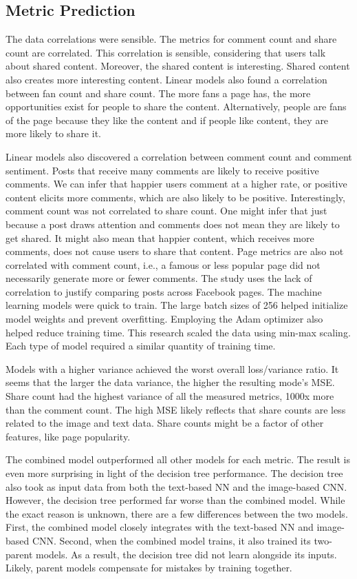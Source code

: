 \documentclass{article}
\begin{document}
\subsection{Metric Prediction}
The data correlations were sensible. The metrics for comment count and share count are correlated. This correlation is sensible, considering that users talk about shared content. Moreover, the shared content is interesting. Shared content also creates more interesting content. Linear models also found a correlation between fan count and share count. The more fans a page has, the more opportunities exist for people to share the content. Alternatively, people are fans of the page because they like the content and if people like content, they are more likely to share it. 

Linear models also discovered a correlation between comment count and comment sentiment. Posts that receive many comments are likely to receive positive comments. We can infer that happier users comment at a higher rate, or positive content elicits more comments, which are also likely to be positive. Interestingly, comment count was not correlated to share count. One might infer that just because a post draws attention and comments does not mean they are likely to get shared. It might also mean that happier content, which receives more comments, does not cause users to share that content. Page metrics are also not correlated with comment count, i.e., a famous or less popular page did not necessarily generate more or fewer comments. The study uses the lack of correlation to justify comparing posts across Facebook pages.
The machine learning models were quick to train. The large batch sizes of 256 helped initialize model weights and prevent overfitting. Employing the Adam optimizer also helped reduce training time. This research scaled the data using min-max scaling. Each type of model required a similar quantity of training time. 

Models with a higher variance achieved the worst overall loss/variance ratio.  It seems that the larger the data variance, the higher the resulting mode's MSE.  Share count had the highest variance of all the measured metrics, 1000x more than the comment count.  The high MSE likely reflects that share counts are less related to the image and text data. Share counts might be a factor of other features, like page popularity.


The combined model outperformed all other models for each metric. The result is even more surprising in light of the decision tree performance. The decision tree also took as input data from both the text-based NN and the image-based CNN. However, the decision tree performed far worse than the combined model. While the exact reason is unknown, there are a few differences between the two models. First, the combined model closely integrates with the text-based NN and image-based CNN. Second, when the combined model trains, it also trained its two-parent models. As a result, the decision tree did not learn alongside its inputs. Likely, parent models compensate for mistakes by training together.
\end{document}
